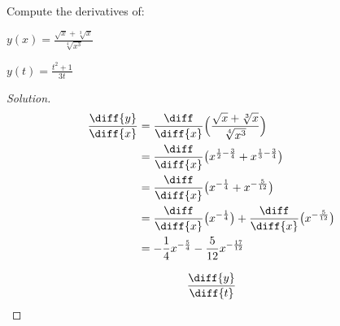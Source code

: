 \documentclass[crop=false,class=book,oneside]{standalone}                      %
\begin{document}
            \begin{problem}
                Compute the derivatives of:
                \begin{enumerate}[label=(\alph*)]
                    \begin{multicols}{2}
                        \item $y(x)=\frac{\sqrt{x}+\sqrt[3]{x}}%
                                         {\sqrt[4]{x^{3}}}$
                        \item $y(t)=\frac{t^{2}+1}{3t}$
                    \end{multicols}
                \end{enumerate}
            \end{problem}
            \begin{proof}[Solution]
                \par\hfill\par
                \begin{minipage}[b]{.49\textwidth}
                    \centering
                    \begin{align*}
                        \frac{\diff{y}}{\diff{x}}
                        &=\frac{\diff}{\diff{x}}\Big(
                            \frac{\sqrt{x}+\sqrt[3]{x}}
                                 {\sqrt[4]{x^{3}}}\Big)\\
                        &=\frac{\diff}{\diff{x}}\big(
                                x^{\frac{1}{2}-\frac{3}{4}}+
                                x^{\frac{1}{3}-\frac{3}{4}}\big)\\
                        &=\frac{\diff}{\diff{x}}\big(
                                x^{-\frac{1}{4}}+
                                x^{-\frac{5}{12}}\big)\\
                        &=\frac{\diff}{\diff{x}}\big(
                                x^{-\frac{1}{4}}\big)+
                                \frac{\diff}{\diff{x}}
                                \big(x^{-\frac{5}{12}}\big)\\
                        &=-\frac{1}{4}x^{-\frac{5}{4}}-
                            \frac{5}{12}x^{-\frac{17}{12}}
                    \end{align*}
                \end{minipage}
                \hfill
                \vline
                \begin{minipage}[b]{.49\textwidth}
                    \centering
                    \begin{align*}
                        \frac{\diff{y}}{\diff{t}}

\end{align*}
\end{minipage}
\end{proof}
\end{document}
